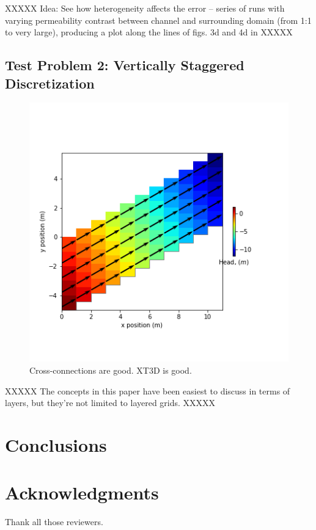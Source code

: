 \documentclass{article}
\begin{document}
XXXXX Idea: See how heterogeneity affects the error -- series of runs with varying permeability contrast between channel and surrounding domain (from 1:1 to very large), producing a plot along the lines of figs. 3d and 4d in \cite{bardot2022} XXXXX

\subsection{Test Problem 2: Vertically Staggered Discretization}

\begin{figure}[H]
	\begin{center}
	\includegraphics[scale=0.5]{../figures/disu-x-cc-head.png}
	\caption{Cross-connections are good. XT3D is good.}
	\label{fig:mymodel-head}
	\end{center}
\end{figure}

XXXXX The concepts in this paper have been easiest to discuss in terms of layers, but they're not limited to layered grids. XXXXX

\section{Conclusions}

\section{Acknowledgments}
Thank all those reviewers.
\end{document}
